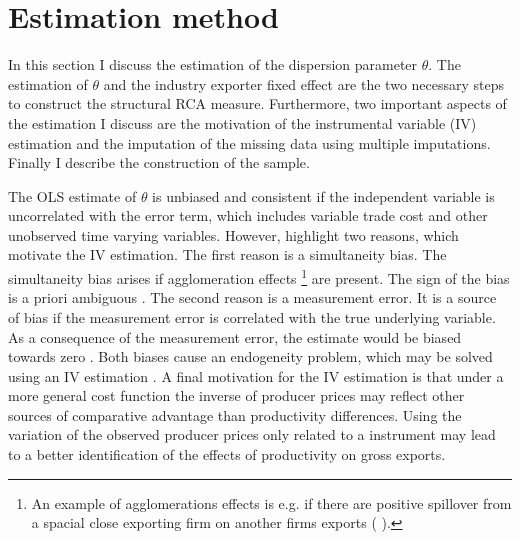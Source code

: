 \section{Estimation method}
In this section I discuss the estimation of the dispersion parameter $\theta$.
The estimation of $\theta$ and the industry exporter fixed effect are the two necessary steps  to construct the structural RCA measure.
Furthermore, two important aspects of the estimation I discuss are the motivation of the instrumental variable (IV) estimation and the imputation of the missing data using multiple imputations.
Finally I describe the construction of the sample.
\par %
The OLS estimate of $\theta$ is unbiased  and consistent if the independent variable is uncorrelated with the error term, which includes variable trade cost and other unobserved time varying variables.
However, \textcite{costinot} highlight two reasons, which motivate the IV estimation.
The first reason is a simultaneity bias. The simultaneity bias arises if agglomeration effects \footnote{An example of agglomerations effects is e.g. if there are positive spillover from a spacial close exporting firm on another firms exports (\cite{bernard2004} ).} are present.
The sign of the bias is a priori ambiguous \parencite{costinot}.
The second reason is a measurement error. It is a source of bias if the measurement error is correlated with the true underlying variable.
As a consequence of the measurement error, the estimate would be biased towards zero \parencite[p.85]{greene}.
Both biases cause an endogeneity problem, which may be solved using an IV estimation  \parencite[p.139]{Dhaene}.
A final motivation for the IV estimation is that under a more general cost function the inverse of producer prices may reflect other sources of comparative advantage than productivity differences.
Using the variation of the observed producer prices only related to a instrument may lead to a better identification of the effects of productivity on gross exports.
